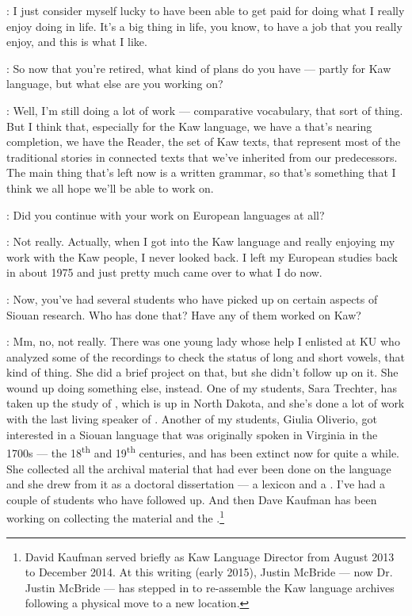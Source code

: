 \documentclass[output=paper]{LSP/langsci}
\begin{document}
: I just consider myself lucky to have been able to get paid for doing what I really enjoy doing in life. It's a big thing in life, you know, to have a job that you really enjoy, and this is what I like.

: So now that you're retired, what kind of plans do you have --- partly for Kaw language, but what else are you working on?

: Well, I'm still doing a lot of work --- comparative vocabulary, that sort of thing. But I think that, especially for the Kaw language, we have a  that's nearing completion, we have the Reader, the set of Kaw texts, that represent most of the traditional stories in connected texts that we've inherited from our predecessors. The main thing that's left now is a written grammar, so that's something that I think we all hope we'll be able to work on.

: Did you continue with your work on European languages at all?

: Not really. Actually, when I got into the Kaw language and really enjoying my work with the Kaw people, I never looked back. I left my European studies back in about 1975 and just pretty much came over to what I do now.

: Now, you've had several students who have picked up on certain aspects of Siouan research. Who has done that? Have any of them worked on Kaw?

: Mm, no, not really. There was one young lady whose help I enlisted at KU who analyzed some of the recordings to check the status of long and short vowels, that kind of thing. She did a brief project on that, but she didn't follow up on it. She wound up doing something else, instead. One of my students, Sara Trechter, has taken up the study of , which is up in North Dakota, and she's done a lot of work with the last living speaker of . Another of my students, Giulia Oliverio, got interested in a Siouan language that was originally spoken in Virginia in the 1700s --- the 18\textsuperscript{th} and 19\textsuperscript{th} centuries, and has been extinct now for quite a while. She collected all the archival material that had ever been done on the  language and she drew from it as a doctoral dissertation --- a lexicon and a . I've had a couple of students who have followed up. And then Dave Kaufman has been working on collecting the  material and the  .\footnote{David Kaufman served briefly as Kaw Language Director from August 2013 to December 2014. At this writing (early 2015), Justin McBride --- now Dr. Justin McBride --- has stepped in to re-assemble the Kaw language archives following a physical move to a new location.}
\end{document}
